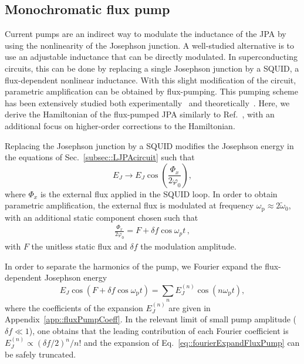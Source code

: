 \documentclass[pra,twocolumn,superscriptaddress]{revtex4-1}
\newcommand{\wpump}[0]{\omega_{\mathrm{p}}}
\newcommand{\df}[0]{\delta\!f}
\newcommand{\parO}[1]{\left(#1\right)}
\begin{document}
\subsection{Monochromatic flux pump}\label{subsec::fluxPump}
Current pumps are an indirect way to modulate the inductance of the JPA by using the nonlinearity of the Josephson junction. 
A well-studied alternative is to use an adjustable inductance that can be directly modulated. 
In superconducting circuits, this can be done by replacing a single Josephson junction by a SQUID, a flux-dependent nonlinear inductance. 
% 
With this slight modification of the circuit, parametric amplification can be obtained by flux-pumping. This pumping scheme has been extensively studied both experimentally~\cite{Yamamoto:2008dp,Zhou:2014fk,Krantz:2013vn} and theoretically~\cite{Wustmann:2013uq}.
% 
Here, we derive the Hamiltonian of the flux-pumped JPA similarly to Ref.~\cite{Wustmann:2013uq}, with an additional focus on higher-order corrections to the Hamiltonian.

Replacing the Josephson junction by a SQUID modifies the Josephson energy in the equations of Sec.~\ref{subsec::LJPAcircuit} such that~\cite{Tinkham:2004uq}
% 
\begin{equation}
	E_J \rightarrow E_J \cos \parO{\frac{\Phi_x}{2\varphi_0}},
\end{equation}
% 
where $\Phi_x$ is the external flux applied in the SQUID loop. 
% 
In order to obtain parametric amplification, the external flux is modulated at frequency $\wpump \approx 2 \tilde{\omega}_0 $, with an additional static component chosen such that~\cite{Wustmann:2013uq}
% 
\begin{align}
	\frac{\Phi_x}{2 \varphi_0} = F + \df \cos \omega_p t \,,
\end{align}
% 
with $F$ the unitless static flux and $\df$ the modulation amplitude. 

In order to separate the harmonics of the pump, we Fourier expand the flux-dependent Josephson energy 
\begin{equation}
	E_J \cos \parO{F + \df \cos \wpump t}  = \sum_n E_J^{(n)} \cos(n \wpump t),
	\label{eq::fourierExpandFluxPump}
\end{equation}
where the coefficients of the expansion $E_J^{(n)}$ are given in Appendix~\ref{app::fluxPumpCoeff}.
In the relevant limit of small pump amplitude ($\df \ll 1 $), one obtains that the leading contribution of each Fourier coefficient is $E_J^{(n)} \propto \parO{\df/2}^n/n!$ and the expansion of Eq.~\eqref{eq::fourierExpandFluxPump} can be safely truncated.
\end{document}
